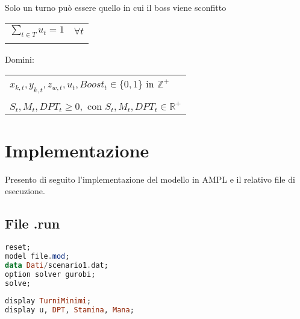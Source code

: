 \documentclass[12pt]{article}
\begin{document}
    Solo un turno può essere quello in cui il boss viene sconfitto \\
    \begin{tabular*}{\textwidth}{@{\extracolsep{\fill}} ll}
        \\
        $\sum_{t \in T} u_t = 1$  & $\forall t$\\
        \\
    \end{tabular*}

    Domini:\\
    \begin{tabular*}{\textwidth}{@{\extracolsep{\fill}} l}\\
        $x_{k,t}, y_{k,t}, z_{w,t}, u_t, Boost_t \in \{0,1\}$ in $\mathbb{Z}^+$\\
         \\
         $S_t, M_t, DPT_t \geq 0, \text{ con  } S_t, M_t, DPT_t \in \mathbb{R}^+$\\
    \end{tabular*}
    
    \section{Implementazione}
    Presento di seguito l'implementazione del modello in AMPL e il relativo file di esecuzione.
    \subsection{File .run}
    \begin{lstlisting}[language=haskell, frame=single, caption={File di esecuzione}, captionpos=b, keywordstyle=\color{purple}]  
reset;
model file.mod;
data Dati/scenario1.dat;
option solver gurobi;
solve;
        
display TurniMinimi; 
display u, DPT, Stamina, Mana; 
    \end{lstlisting}
\newpage
\end{document}
